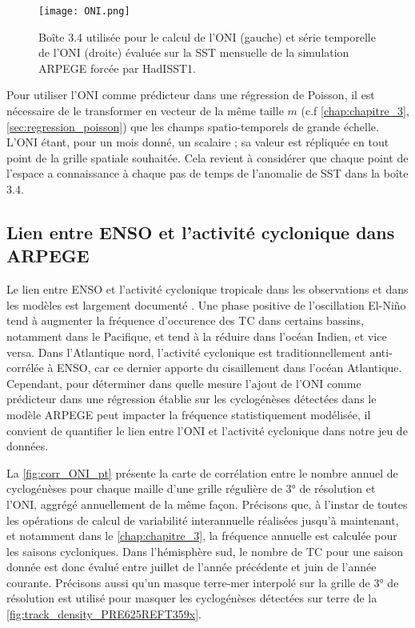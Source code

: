 \documentclass[../main.tex]{subfiles}
\begin{document}
\begin{figure}[htpb]
    \centering
    \texttt{[image: ONI.png]}
    \caption{Boîte 3.4 utilisée pour le calcul de l'ONI (gauche) et série temporelle de l'ONI (droite) évaluée sur la SST mensuelle de la
    simulation ARPEGE forcée par HadISST1.}
    \label{fig:ONI}
\end{figure}

Pour utiliser l'ONI comme prédicteur dans une régression de Poisson, il est nécessaire de le transformer en vecteur de la même taille $m$ (c.f
\cref{chap:chapitre_3}, \cref{sec:regression_poisson}) que les champs spatio-temporels de grande échelle. L'ONI étant, pour un mois donné, un scalaire ; sa
valeur est répliquée en tout point de la grille spatiale souhaitée. Cela revient à considérer que chaque point de l'espace a connaissance à chaque
pas de temps de l'anomalie de SST dans la boîte 3.4.

\subsection{Lien entre ENSO et l'activité cyclonique dans ARPEGE}\label{sec:lien_enso_tracking}

Le lien entre ENSO et l'activité cyclonique tropicale dans les observations et dans les modèles est largement documenté
\parencite{chan_tropical_1985,wu_gcm_1992,landsea_ninosouthern_2000,mcdonald_tropical_2005,lin_enso_2020}. Une phase positive de l'oscillation El-Niño tend à
augmenter la fréquence d'occurence des TC dans certains bassins, notamment dans le Pacifique, et tend à la réduire dans l'océan Indien, et vice versa. Dans
l'Atlantique nord, l'activité cyclonique est traditionnellement anti-corrélée à ENSO, car ce dernier apporte du cisaillement dans l'océan Atlantique. Cependant,
pour déterminer dans quelle mesure l'ajout de l'ONI comme prédicteur dans une régression établie sur les cyclogénèses détectées dans le modèle ARPEGE peut impacter la
fréquence statistiquement modélisée, il convient de quantifier le lien entre l'ONI et l'activité cyclonique dans notre jeu de données.

La \cref{fig:corr_ONI_pt} présente la carte de corrélation entre le nombre annuel de cyclogénèses pour chaque maille d'une grille régulière de \ang{3} de
résolution et l'ONI, aggrégé annuellement de la même façon. Précisons que, à l'instar de toutes les opérations de calcul de variabilité interannuelle
réalisées jusqu'à maintenant, et notamment dans le \cref{chap:chapitre_3}, la fréquence annuelle est calculée pour les saisons cycloniques. Dans l'hémisphère
sud, le nombre de TC pour une saison donnée est donc évalué entre juillet de l'année précédente et juin de l'année courante. Précisons aussi qu'un masque
terre-mer interpolé sur la grille de \ang{3} de résolution est utilisé pour masquer les cyclogénèses détectées sur terre de la
\cref{fig:track_density_PRE625REFT359x}.
\end{document}

